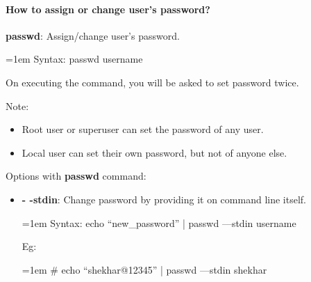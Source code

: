 \begin{flushleft}
	\newpage
	
	\paragraph{How to assign or change user’s password?}
	
	\bigskip
	\textbf{passwd}: Assign/change user's password.
	
	\begin{tcolorbox}[breakable,notitle,boxrule=0pt,colback=pink,colframe=pink]
		\color{black}
		\font=1em
		Syntax: passwd username
		\font=4pt
	\end{tcolorbox}
	On executing the command, you will be asked to set password twice.
	
	\begin{tcolorbox}[breakable,notitle,boxrule=0pt,colback=yellow,colframe=yellow]
		\color{black}
		Note: 
		\begin{itemize}
			\item Root user or superuser can set the password of any user.
			\item Local user can set their own password, but not of anyone else.
		\end{itemize}

	\end{tcolorbox}
	
	Options with \textbf{passwd} command:
	
	\begin{itemize}
		\item \textbf{- -stdin}: Change password by providing it on command line itself.
		\begin{tcolorbox}[breakable,notitle,boxrule=0pt,colback=pink,colframe=pink]
			\color{black}
			\font=1em
			Syntax: echo “new\_password” | passwd ---stdin username
			\font=4pt
		\end{tcolorbox}
		Eg:
		\bigskip
		\begin{tcolorbox}[breakable,notitle,boxrule=-0pt,colback=black,colframe=black]
			\color{green}
			\font=1em
			\# echo “shekhar@12345” | passwd ---stdin shekhar
			\font=4pt
		\end{tcolorbox}
	\end{itemize}
	
	
	
	\newpage
	

\end{flushleft}
